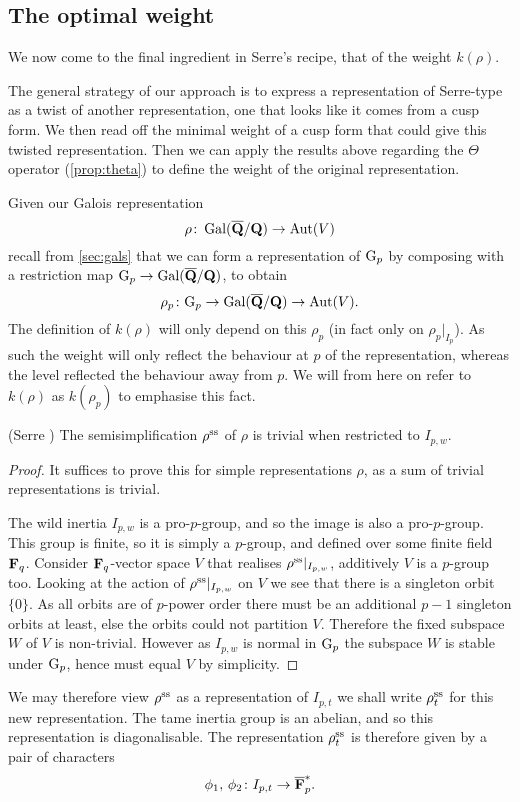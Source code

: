 \documentclass[a4paper,12pt]{article}
\begin{document}
\subsection{The optimal weight}
We now come to the final ingredient in Serre's recipe, that of the weight $k(\rho)$.

The general strategy of our approach is to express a representation of Serre-type as a twist of another representation, one that looks like it comes from a cusp form.
We then read off the minimal weight of a cusp form that could give this twisted representation.
Then we can apply the results above regarding the $\Theta$ operator (\cref{prop:theta}) to define the weight of the original representation.

Given our Galois representation
\[
\rho \colon \operatorname{Gal}(\overline{\mathbf{Q}}/\mathbf{Q}) \to \operatorname{Aut}(V)
\]
recall from \cref{sec:gals} that we can form a representation of $\mathrm{G}_p$ by composing with a restriction map $\mathrm{G}_p \to\operatorname{Gal}(\overline{\mathbf{Q}}/\mathbf{Q})$, to obtain
\[
\rho_p\colon \mathrm{G}_p \to \operatorname{Gal}(\overline{\mathbf{Q}}/\mathbf{Q}) \to \operatorname{Aut}(V).
\]
The definition of $k(\rho)$ will only depend on this $\rho_p$ (in fact only on $\rho_p|_{I_p}$).
As such the weight will only reflect the behaviour at $p$ of the representation, whereas the level reflected the behaviour away from $p$.
We will from here on refer to $k(\rho)$ as $k(\rho_p)$ to emphasise this fact.

\begin{prop}(Serre \cite[prop. 4]{Serre72})\label{prop:wildtriv}
The semisimplification $\rho^\text{ss}$ of $\rho$ is trivial when restricted to $I_{p,w}$.
\end{prop}
\begin{proof}
It suffices to prove this for simple representations $\rho$, as a sum of trivial representations is trivial.

The wild inertia $I_{p,w}$ is a pro-$p$-group, and so the image is also a pro-$p$-group.
This group is finite, so it is simply a $p$-group, and defined over some finite field $\mathbf{F}_q$.
Consider $\mathbf{F}_q$-vector space $V$ that realises $\rho^\text{ss}|_{I_{p,w}}$,  additively $V$ is a $p$-group too.
Looking at the action of $\rho^\text{ss}|_{I_{p,w}}$ on $V$ we see that there is a singleton orbit $\{0\}$.
As all orbits are of $p$-power order there must be an additional $p-1$ singleton orbits at least, else the orbits could not partition $V$.
Therefore the fixed subspace $W$ of $V$ is non-trivial.
However as $I_{p,w}$ is normal in $\mathrm{G}_p$ the subspace $W$ is stable under $\mathrm{G}_p$, hence must equal $V$ by simplicity.
\end{proof}

We may therefore view $\rho^\text{ss}$ as a representation of $I_{p,t}$ we shall write $\rho^\text{ss}_t$ for this new representation.
The tame inertia group is an abelian, and so this representation is diagonalisable.
The representation $\rho^\text{ss}_t$ is therefore given by a pair of characters
\[
\phi_1,\,\phi_2\colon I_{p,t} \to \overline{\mathbf{F}}_p^*.
\]
\end{document}
